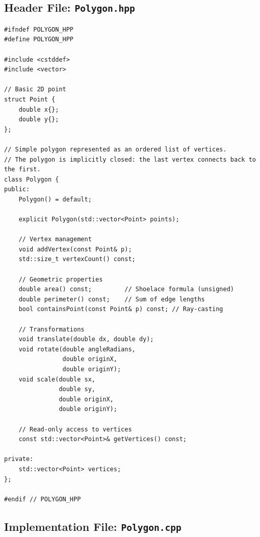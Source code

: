 \documentclass[11pt,a4paper]{article}
\begin{document}
\subsection{Header File: \texttt{Polygon.hpp}}

\begin{verbatim}
#ifndef POLYGON_HPP
#define POLYGON_HPP

#include <cstddef>
#include <vector>

// Basic 2D point
struct Point {
    double x{};
    double y{};
};

// Simple polygon represented as an ordered list of vertices.
// The polygon is implicitly closed: the last vertex connects back to the first.
class Polygon {
public:
    Polygon() = default;

    explicit Polygon(std::vector<Point> points);

    // Vertex management
    void addVertex(const Point& p);
    std::size_t vertexCount() const;

    // Geometric properties
    double area() const;         // Shoelace formula (unsigned)
    double perimeter() const;    // Sum of edge lengths
    bool containsPoint(const Point& p) const; // Ray-casting

    // Transformations
    void translate(double dx, double dy);
    void rotate(double angleRadians,
                double originX,
                double originY);
    void scale(double sx,
               double sy,
               double originX,
               double originY);

    // Read-only access to vertices
    const std::vector<Point>& getVertices() const;

private:
    std::vector<Point> vertices;
};

#endif // POLYGON_HPP
\end{verbatim}

\subsection{Implementation File: \texttt{Polygon.cpp}}
\end{document}
